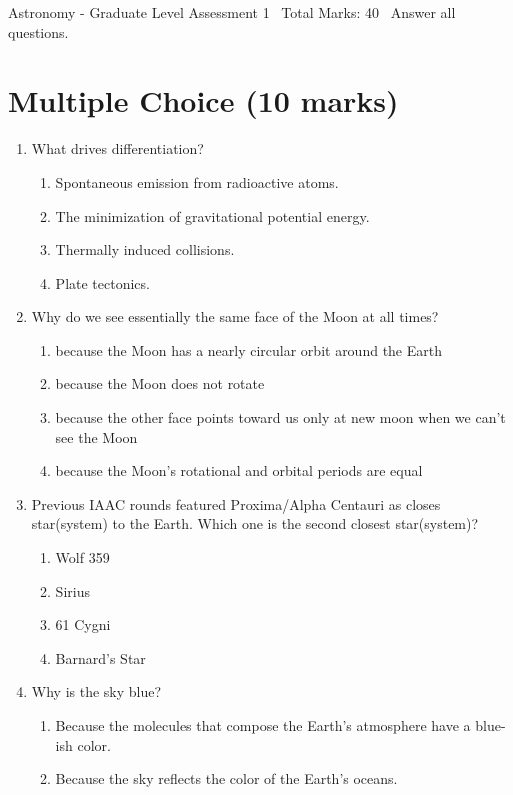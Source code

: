 \documentclass[12pt]{article}
\begin{document}
\begin{center}
Astronomy - Graduate Level Assessment 1 \
Total Marks: 40 \
Answer all questions.
\end{center}

\section*{Multiple Choice (10 marks)}
\begin{enumerate}[label=\arabic*.]
\item What drives differentiation?
\begin{enumerate}[label=(\alph*)]
    \item Spontaneous emission from radioactive atoms.
    \item The minimization of gravitational potential energy.
    \item Thermally induced collisions.
    \item Plate tectonics.
\end{enumerate}
\item Why do we see essentially the same face of the Moon at all times?
\begin{enumerate}[label=(\alph*)]
    \item because the Moon has a nearly circular orbit around the Earth
    \item because the Moon does not rotate
    \item because the other face points toward us only at new moon when we can't see the Moon
    \item because the Moon's rotational and orbital periods are equal
\end{enumerate}
\item Previous IAAC rounds featured Proxima/Alpha Centauri as closes star(system) to the Earth.
Which one is the second closest star(system)?
\begin{enumerate}[label=(\alph*)]
    \item Wolf 359
    \item Sirius
    \item 61 Cygni
    \item Barnard's Star
\end{enumerate}
\item Why is the sky blue?
\begin{enumerate}[label=(\alph*)]
    \item Because the molecules that compose the Earth's atmosphere have a blue-ish color.
    \item Because the sky reflects the color of the Earth's oceans.

\end{enumerate}
\end{enumerate}
\end{document}

